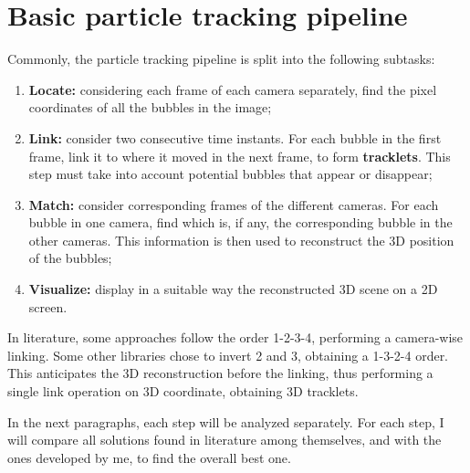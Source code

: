 \chapter{Basic particle tracking pipeline}
\label{chap:basicpipeline}

Commonly, the particle tracking pipeline is split into the following subtasks:
\begin{enumerate}
	\itemsep 0em
	\item \textbf{Locate:} considering each frame of each camera separately, find the pixel coordinates of all the bubbles in the image;
	\item \textbf{Link:} consider two consecutive time instants. For each bubble in the first frame, link it to where it moved in the next frame, to form \textbf{tracklets}. This step must take into account potential bubbles that appear or disappear;
	\item \textbf{Match:} consider corresponding frames of the different cameras. For each bubble in one camera, find which is, if any, the corresponding bubble in the other cameras. This information is then used to reconstruct the 3D position of the bubbles;
	\item \textbf{Visualize:} display in a suitable way the reconstructed 3D scene on a 2D screen.
\end{enumerate}
In literature, some approaches follow the order 1-2-3-4, performing a camera-wise linking.
Some other libraries chose to invert 2 and 3, obtaining a 1-3-2-4 order.
This anticipates the 3D reconstruction before the linking, thus performing a single link operation on 3D coordinate, obtaining 3D tracklets.

In the next paragraphs, each step will be analyzed separately.
For each step, I will compare all solutions found in literature among themselves, and with the ones developed by me, to find the overall best one.
